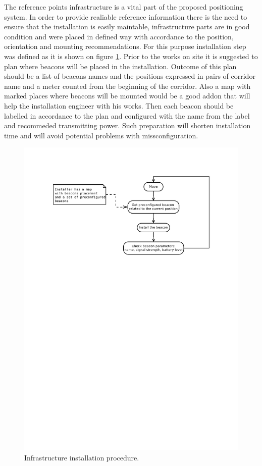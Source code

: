\documentclass[../main.tex]{subfiles}
\begin{document}
The reference points infrastructure is a vital part of the proposed positioning system. In order to provide realiable reference information there is the need to ensure that the installation is easily maintable, infrastructure parts are in good condition and were placed in defined way with accordance to the position, orientation and mounting recommendations. For this purpose installation step was defined as it is shown on figure \ref{fig:infrastructure_installation_proc}. Prior to the works on site it is suggested to plan where beacons will be placed in the installation. Outcome of this plan should be a list of beacons names and the positions expressed in pairs of corridor name and a meter counted from the beginning of the corridor. Also a map with marked places where beacons will be mounted would be a good addon that will help the installation engineer with his works. Then each beacon should be labelled in accordance to the plan and configured with the name from the label and recommeded transmitting power. Such preparation will shorten installation time and will avoid potential problems with missconfiguration.

\begin{figure}[!htbp]
\includegraphics[width=\textwidth, trim={0 18cm 0 0},clip]{pictures/infrastructure_installation_proc.pdf}
\centering
\caption{Infrastructure installation procedure.}
\label{fig:infrastructure_installation_proc}
\end{figure}
\end{document}
